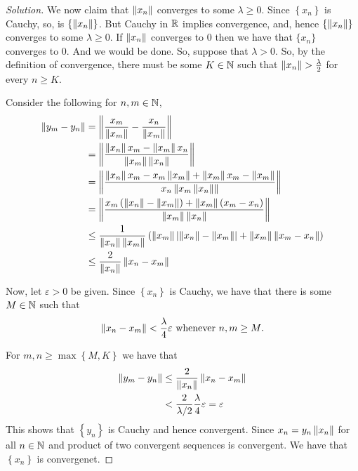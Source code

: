\begin{proof}[Solution]
    We now claim that $\left\lVert x_{n} \right\rVert$ converges to some $\lambda \ge 0$. Since $\left\{ x_{n} \right\}$ is Cauchy, so, is $\left\{ \left\lVert x_{n} \right\rVert \right\}$. But Cauchy in $\mathbb R$ implies convergence, and, hence $\left\{ \left\lVert x_{n} \right\rVert \right\}$ converges to some $\lambda \ge 0$. If $\left\lVert x_{n} \right\rVert$ converges to $0$ then we have that $\{ x_{n} \}$ converges to $0$. And we would be done. So, suppose that $\lambda > 0$. So, by the definition of convergence, there must be some $K \in \mathbb N$ such that $\left\lVert x_{n} \right\rVert > \frac{\lambda}{2}$ for every $n \ge K$.

Consider the following for $n, m \in \mathbb N$,
\begin{align*}
    \left\lVert y_{m} - y_{n} \right\rVert &=  \left\lVert \frac{x_{m}}{\left\lVert x_{m} \right\rVert} - \frac{x_{n}}{\left\lVert x_{m} \right\rVert} \right\rVert \\
    &= \left\lVert \frac{\left\lVert x_{n} \right\rVert x_{m} - \left\lVert x_m \right\rVert x_{n}}{\left\lVert x_{m} \right\rVert\left\lVert x_{n} \right\rVert} \right\rVert \\
    &= \left\lVert \frac{\left\lVert x_{n} \right\rVert x_{m} - x_{m} \left\lVert x_{m} \right\rVert + \left\lVert x_{m} \right\rVert x_{m} - \left\lVert x_{m} \right\rVert }{x_{n}\left\lVert x_{m}\left\lVert x_n \right\rVert \right\rVert}  \right\rVert \\
    &= \left\lVert \frac{x_{m} \left( \left\lVert x_{n} \right\rVert - \left\lVert x_m \right\rVert \right) + \left\lVert x_m \right\rVert \left( x_{m} -x_{n} \right)}{\left\lVert x_{m} \right\rVert\left\lVert x_{n} \right\rVert} \right\rVert \\
    &\le \frac{1}{\left\lVert x_{n} \right\rVert\left\lVert x_{m} \right\rVert} \left( \left\lVert x_{m} \right\rVert \left\lvert \left\lVert x_{n} \right\rVert - \left\lVert x_{m} \right\rVert \right\rvert + \left\lVert x_{m} \right\rVert \left\lVert x_{m} - x_{n} \right\rVert \right) \\
    & \le \frac{2}{\left\lVert x_{n} \right\rVert} \left\lVert x_{n} - x_{m} \right\rVert
\end{align*}

    Now, let $\varepsilon > 0$ be given. Since $\left\{ x_{n} \right\}$ is Cauchy, we have that there is some $M \in \mathbb N$ such that 
    \begin{align*}
	\left\lVert x_{n} - x_{m} \right\rVert < \frac{\lambda}{4} \varepsilon \text{ whenever } n,m \ge M\text{.}
    \end{align*}

    For $m,n \ge \max \left\{ M,K \right\}$ we have that
    \begin{align*}
	\left\lVert y_{m} - y_{n} \right\rVert &\le \frac{2}{\left\lVert x_{n} \right\rVert} \left\lVert x_{n} - x_{m} \right\rVert \\
	& < \frac{2}{\lambda/2} \frac{\lambda}{4} \varepsilon = \varepsilon
    \end{align*}
    This shows that $\left\{ y_{n} \right\}$ is Cauchy and hence convergent. Since $x_{n} = y_{n} \left\lVert x_{n} \right\rVert$ for all $n\in \mathbb N$ and product of two convergent sequences is convergent. We have that $\left\{ x_{n} \right\}$ is convergenet.
\end{proof}
